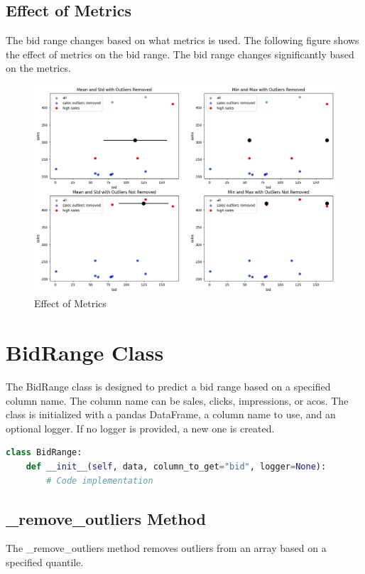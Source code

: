 \subsection{Effect of Metrics}

The bid range changes based on what metrics is used. The following figure shows the effect of metrics on the bid range. The bid range changes significantly based on the metrics.

\begin{figure}[ht]
    \includegraphics[width=\textwidth, height=0.6\textwidth]{images/part2/bid_range_1.png}
    \centering
    \caption{Effect of Metrics}
\end{figure}


\section{BidRange Class}

The BidRange class is designed to predict a bid range based on a specified column name. The column name can be sales, clicks, impressions, or acos. The class is initialized with a pandas DataFrame, a column name to use, and an optional logger. If no logger is provided, a new one is created.

\begin{lstlisting}[language=Python]
class BidRange:
    def __init__(self, data, column_to_get="bid", logger=None):
        # Code implementation
\end{lstlisting}

\subsection{\_remove\_outliers Method}

The \_remove\_outliers method removes outliers from an array based on a specified quantile.

